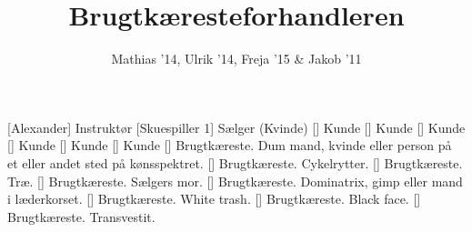 \documentclass[a4paper,11pt]{article}
\title{Brugtkæresteforhandleren}
\author{Mathias '14, Ulrik '14, Freja '15 \& Jakob '11}
\begin{document}
\maketitle

\begin{roles}
[Alexander] Instruktør
[Skuespiller 1] Sælger (Kvinde)
[] Kunde 
[] Kunde
[] Kunde
[] Kunde
[] Kunde
[] Kunde
[] Brugtkæreste. Dum mand, kvinde eller person på et eller andet sted på kønsspektret. %
[] Brugtkæreste. Cykelrytter. %
[] Brugtkæreste. Træ. 
[] Brugtkæreste. Sælgers mor. %
[] Brugtkæreste. Dominatrix, gimp eller mand i læderkorset. %
[] Brugtkæreste. White trash. 
[] Brugtkæreste. Black face.
[] Brugtkæreste. Transvestit.
\end{roles}


\begin{props}
\end{props}
\end{document}
